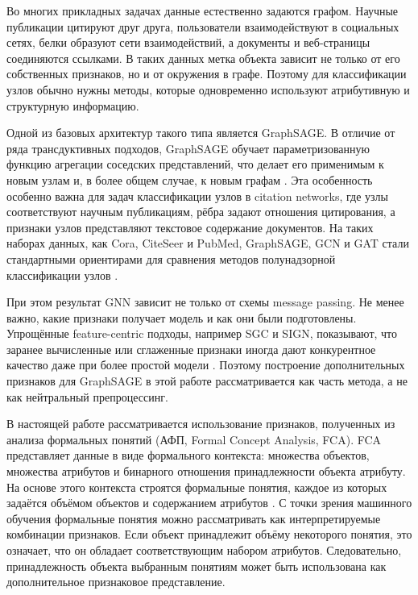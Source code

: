 \documentclass[14pt,a4paper]{extarticle}
\begin{document}
Во многих прикладных задачах данные естественно задаются графом. Научные
публикации цитируют друг друга, пользователи взаимодействуют в социальных сетях,
белки образуют сети взаимодействий, а документы и веб-страницы соединяются
ссылками. В таких данных метка объекта зависит не только от его собственных
признаков, но и от окружения в графе. Поэтому для классификации узлов обычно
нужны методы, которые одновременно используют атрибутивную и структурную
информацию.

Одной из базовых архитектур такого типа является GraphSAGE. В отличие от ряда
трансдуктивных подходов, GraphSAGE обучает параметризованную функцию агрегации
соседских представлений, что делает его применимым к новым узлам и, в более
общем случае, к новым графам \cite{hamilton2017graphsage}. Эта особенность
особенно важна для задач классификации узлов в citation networks, где узлы
соответствуют научным публикациям, рёбра задают отношения цитирования, а
признаки узлов представляют текстовое содержание документов. На таких наборах
данных, как Cora, CiteSeer и PubMed, GraphSAGE, GCN и GAT стали стандартными
ориентирами для сравнения методов полунадзорной классификации узлов
\cite{yang2016planetoid,kipf2017gcn,velickovic2018gat}.

При этом результат GNN зависит не только от схемы message passing. Не менее
важно, какие признаки получает модель и как они были подготовлены. Упрощённые
feature-centric подходы, например SGC и SIGN, показывают, что заранее вычисленные
или сглаженные признаки иногда дают конкурентное качество даже при более простой
модели \cite{wu2019sgc,frasca2020sign}. Поэтому построение дополнительных
признаков для GraphSAGE в этой работе рассматривается как часть метода, а не как
нейтральный препроцессинг.

В настоящей работе рассматривается использование признаков, полученных из анализа
формальных понятий (АФП, Formal Concept Analysis, FCA). FCA представляет данные в
виде формального контекста: множества объектов, множества атрибутов и бинарного
отношения принадлежности объекта атрибуту. На основе этого контекста строятся
формальные понятия, каждое из которых задаётся объёмом объектов и содержанием
атрибутов \cite{ganter1999formal,wille1982restructuring}. С точки зрения
машинного обучения формальные понятия можно рассматривать как интерпретируемые
комбинации признаков. Если объект принадлежит объёму некоторого понятия, это
означает, что он обладает соответствующим набором атрибутов. Следовательно,
принадлежность объекта выбранным понятиям может быть использована как
дополнительное признаковое представление.
\end{document}
